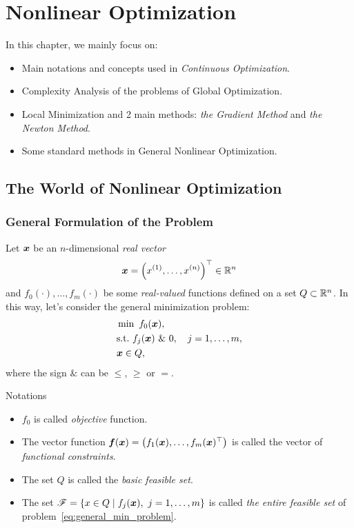 \chapter{Nonlinear Optimization}\label{chap:nonlinear_optimization}

In this chapter, we mainly focus on:
\begin{itemize}
    \item Main notations and concepts used in \emph{Continuous Optimization}.
    \item Complexity Analysis of the problems of Global Optimization.
    \item Local Minimization and 2 main methods: \emph{the Gradient Method} and \emph{the Newton Method}.
    \item Some standard methods in General Nonlinear Optimization.
\end{itemize}

\section{The World of Nonlinear Optimization}\label{sec:the_world_of_nonlinear_optimization}

\subsection{General Formulation of the Problem}\label{subsec:General_Formulation_of_the_Problem}
Let \(\boldsymbol{x}\) be an \(n\)-dimensional \emph{real vector}
\[
    \boldsymbol{x} = \left( x^{(1)}, \dots, x^{(n)} \right)^\top \in \mathbb{R}^n
\]
and \(f_0(\cdot), \dots, f_m(\cdot)\) be some \emph{real-valued} functions defined on a set \(Q \subset \mathbb{R}^n\). In this way, let's consider the general minimization problem:
\begin{equation}\label{eq:general_min_problem}
    \begin{aligned}
        &\min ~ f_0(\boldsymbol{x}), \\
        &\text{s.t.}~f_j(\boldsymbol{x}) ~ \& ~ 0, \quad j = 1, \dots, m,\\
        &\boldsymbol{x} \in Q,
    \end{aligned}
\end{equation}
where the sign \(\&\) can be \(\le\), \(\ge\) or \(=\).

\begin{note}{Notations}
    \begin{itemize}
        \item \(f_0\) is called \emph{objective} function.
        \item The vector function \(\boldsymbol{f}(\boldsymbol{x}) = \left( f_1(\boldsymbol{x}), \dots, f_m(\boldsymbol{x})^\top \right)\) is called the vector of \emph{functional constraints}.
        \item The set \(Q\) is called the \emph{basic feasible set}.
        \item The set \( \mathscr{F} = \{ x \in Q \mid f_j(\boldsymbol{x}), ~j=1, \dots, m \}\) is called \emph{the entire feasible set} of problem~\ref{eq:general_min_problem}. 
    \end{itemize}
\end{note}



